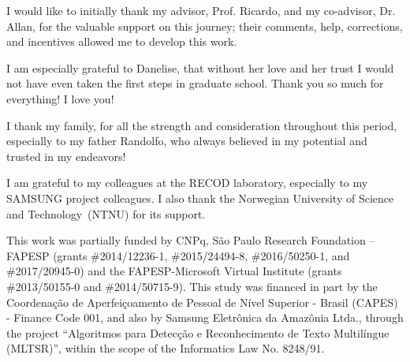 \documentclass[Ingles,Final]{ic-tese-v3}
\begin{document}


I would like to initially thank my advisor, Prof. Ricardo, and my co-advisor, Dr. Allan, for the valuable support on this journey; their comments, help, corrections, and incentives allowed me to develop this work.

I am especially grateful to Danelise, that without her love and her trust I would not have even taken the first steps in graduate school. Thank you so much for everything! I love you!

I thank my family, for all the strength and consideration throughout this period,  especially to my father Randolfo, who always believed in my potential and trusted in my endeavors!

I am grateful to my colleagues at the RECOD laboratory, especially to my SAMSUNG project colleagues. I also thank the Norwegian University of Science and Technology~(NTNU) for its support.

This work was partially funded by CNPq, S\~ao Paulo Research Foundation -- FAPESP (grants \#2014/12236-1, \#2015/24494-8, \#2016/50250-1, and \#2017/20945-0) and the FAPESP-Microsoft Virtual Institute (grants \#2013/50155-0 and \#2014/50715-9). This study was financed in part by the Coordena\c{c}\~{a}o de Aperfei\c{c}oamento de Pessoal de N\'{i}vel Superior - Brasil (CAPES) - Finance Code 001, and also by Samsung Eletr\^{o}nica da Amaz\^{o}nia Ltda., through the project ``Algoritmos para Detec\c{c}\~{a}o e Reconhecimento de Texto Multil\'{i}ngue (MLTSR)'', within the scope of the Informatics Law No. 8248/91.

\begin{resumo}

\end{resumo}


\begin{abstract}

\end{abstract}


\end{document}
